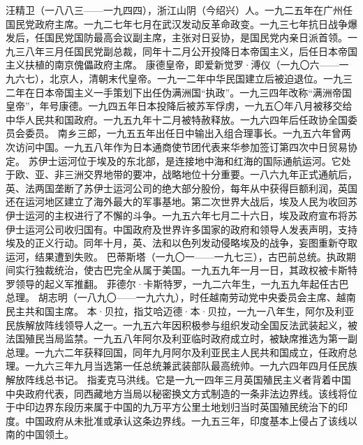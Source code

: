 \begin{maonote}
汪精卫（一八八三——一九四四），浙江山阴（今绍兴）人。一九二五年在广州任国民党政府主席。一九二七年七月在武汉发动反革命政变。一九三七年抗日战争爆发后，任国民党国防最高会议副主席，主张对日妥协，是国民党内亲日派首领。一九三八年三月任国民党副总裁，同年十二月公开投降日本帝国主义，后任日本帝国主义扶植的南京傀儡政府主席。
康德皇帝，即爱新觉罗·溥仪（一九〇六——一九六七），北京人，清朝末代皇帝。一九一二年中华民国建立后被迫退位。一九三二年在日本帝国主义一手策划下出任伪满洲国“执政”。一九三四年改称“满洲帝国皇帝”，年号康德。一九四五年日本投降后被苏军俘虏，一九五〇年八月被移交给中华人民共和国政府。一九五九年十二月被特赦释放。一九六四年后任政协全国委员会委员。
南乡三郎，一九五五年出任日中输出入组合理事长。一九五六年曾两次访问中国。一九五八年作为日本通商使节团代表来华参加签订第四次中日贸易协定。
苏伊士运河位于埃及的东北部，是连接地中海和红海的国际通航运河。它处于欧、亚、非三洲交界地带的要冲，战略地位十分重要。一八六九年正式通航后，英、法两国垄断了苏伊士运河公司的绝大部分股份，每年从中获得巨额利润，英国还在运河地区建立了海外最大的军事基地。第二次世界大战后，埃及人民为收回苏伊士运河的主权进行了不懈的斗争。一九五六年七月二十六日，埃及政府宣布将苏伊士运河公司收归国有。中国政府及世界许多国家的政府和领导人发表声明，支持埃及的正义行动。同年十月，英、法和以色列发动侵略埃及的战争，妄图重新夺取运河，结果遭到失败。
巴蒂斯塔（一九〇一——一九七三），古巴前总统。执政期间实行独裁统治，使古巴完全从属于美国。一九五九年一月一日，其政权被卡斯特罗领导的起义军推翻。
菲德尔·卡斯特罗，一九二六年生，一九五九年起任古巴总理。
胡志明（一八九〇——一九六九），时任越南劳动党中央委员会主席、越南民主共和国主席。
本·贝拉，指艾哈迈德·本·贝拉，一九一八年生，阿尔及利亚民族解放阵线领导人之一。一九五六年因积极参与组织发动全国反法武装起义，被法国殖民当局监禁。一九五八年阿尔及利亚临时政府成立时，被缺席推选为第一副总理。一九六二年获释回国，同年九月阿尔及利亚民主人民共和国成立，任政府总理。一九六三年九月当选第一任总统兼武装部队最高统帅。一九六四年四月任民族解放阵线总书记。
指麦克马洪线。它是一九一四年三月英国殖民主义者背着中国中央政府代表，同西藏地方当局以秘密换文方式制造的一条非法边界线。该线将位于中印边界东段历来属于中国的九万平方公里土地划归当时英国殖民统治下的印度。中国政府从未批准或承认这条边界线。一九五三年，印度基本上侵占了该线以南的中国领土。
\end{maonote}
